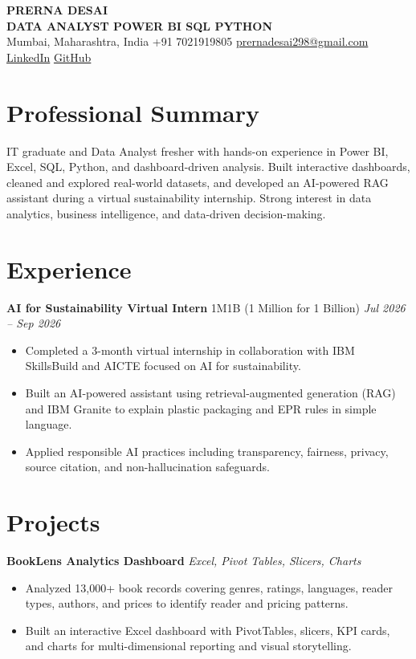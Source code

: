 \documentclass[10pt,a4paper]{article}
\newcommand{\entry}[3]{%
  \textbf{#1} \textbar{} #2 \hfill \textit{#3}\par
}
\begin{document}
\begin{center}
  {\Huge\bfseries PRERNA DESAI}\\[4pt]
  {\large\color{accent}\textbf{DATA ANALYST \textbar{} POWER BI \textbar{} SQL \textbar{} PYTHON}}\\[4pt]
  Mumbai, Maharashtra, India \textbar{} +91 7021919805 \textbar{}
  \href{mailto:prernadesai298@gmail.com}{prernadesai298@gmail.com} \textbar{}
  \href{https://linkedin.com/in/prerna-desai}{LinkedIn} \textbar{}
  \href{https://github.com/DesaiPrerna294}{GitHub}
\end{center}

\section{Professional Summary}
IT graduate and Data Analyst fresher with hands-on experience in Power BI, Excel, SQL, Python, and dashboard-driven analysis. Built interactive dashboards, cleaned and explored real-world datasets, and developed an AI-powered RAG assistant during a virtual sustainability internship. Strong interest in data analytics, business intelligence, and data-driven decision-making.

\section{Experience}
\entry{AI for Sustainability Virtual Intern}{1M1B (1 Million for 1 Billion)}{Jul 2026 -- Sep 2026}
\begin{itemize}
  \item Completed a 3-month virtual internship in collaboration with IBM SkillsBuild and AICTE focused on AI for sustainability.
  \item Built an AI-powered assistant using retrieval-augmented generation (RAG) and IBM Granite to explain plastic packaging and EPR rules in simple language.
  \item Applied responsible AI practices including transparency, fairness, privacy, source citation, and non-hallucination safeguards.
\end{itemize}

\section{Projects}

\textbf{BookLens Analytics Dashboard} \textbar{} \textit{Excel, Pivot Tables, Slicers, Charts}
\begin{itemize}
  \item Analyzed 13,000+ book records covering genres, ratings, languages, reader types, authors, and prices to identify reader and pricing patterns.
  \item Built an interactive Excel dashboard with PivotTables, slicers, KPI cards, and charts for multi-dimensional reporting and visual storytelling.
\end{itemize}
\end{document}
